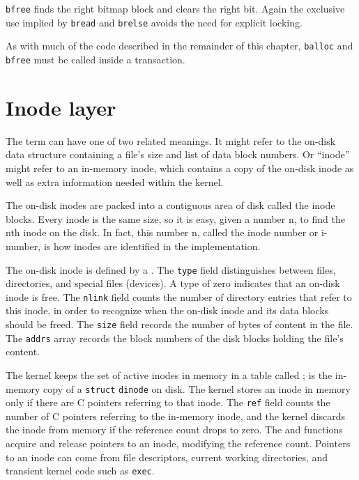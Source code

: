 \lstinline{bfree}
finds the right bitmap block and clears the right bit.
Again the exclusive use implied by
\lstinline{bread}
and
\lstinline{brelse}
avoids the need for explicit locking.

As with much of the code described in the remainder of this chapter, 
\lstinline{balloc}
and
\lstinline{bfree}
must be called inside a transaction.
\section{Inode layer}

The term 
can have one of two related meanings.
It might refer to the on-disk data structure containing
a file's size and list of data block numbers.
Or ``inode'' might refer to an in-memory inode, which contains
a copy of the on-disk inode as well as extra information needed
within the kernel.

The on-disk inodes
are packed into a contiguous area
of disk called the inode blocks.
Every inode is the same size, so it is easy, given a
number n, to find the nth inode on the disk.
In fact, this number n, called the inode number or i-number,
is how inodes are identified in the implementation.

The on-disk inode is defined by a
.
The 
\lstinline{type}
field distinguishes between files, directories, and special
files (devices).
A type of zero indicates that an on-disk inode is free.
The
\lstinline{nlink}
field counts the number of directory entries that
refer to this inode, in order to recognize when the
on-disk inode and its data blocks should be freed.
The
\lstinline{size}
field records the number of bytes of content in the file.
The
\lstinline{addrs}
array records the block numbers of the disk blocks holding
the file's content.

The kernel keeps the set of active inodes in memory
in a table called ;
is the in-memory copy of a 
\lstinline{struct}
\lstinline{dinode}
on disk.
The kernel stores an inode in memory only if there are
C pointers referring to that inode. The
\lstinline{ref}
field counts the number of C pointers referring to the
in-memory inode, and the kernel discards the inode from
memory if the reference count drops to zero.
The
and
functions acquire and release pointers to an inode,
modifying the reference count.
Pointers to an inode can come from file descriptors,
current working directories, and transient kernel code
such as
\lstinline{exec}.

